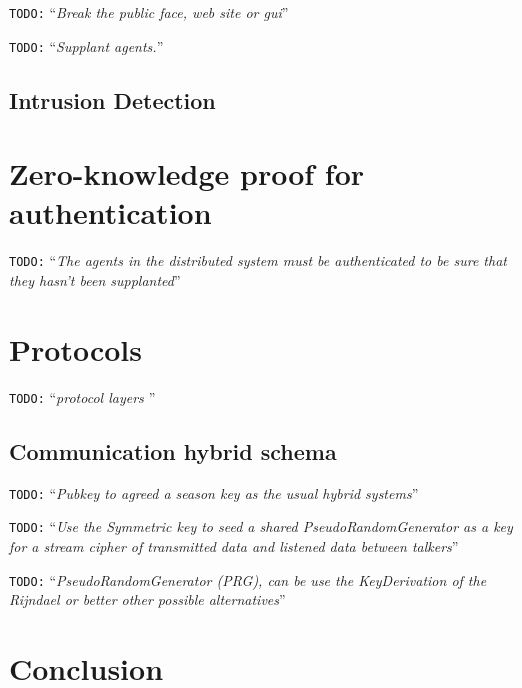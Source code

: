 \documentclass[10pt,a4paper,twoside]{llncs}
\newcommand{\todo}[1]{\texttt{\color{red}TODO:} ``\emph{#1}''}
\begin{document}
\todo{Break the public face, web site or gui}

\todo{Supplant agents.}

%
\subsection{Intrusion Detection}

%
\section{Zero-knowledge proof for authentication \label{sec:auth}}

\todo{The agents in the distributed system must be authenticated to be sure that they hasn't been supplanted}

%
\section{Protocols}

\todo{protocol layers \cite{Schneier:1995:ACP:572932}}

%
\subsection{Communication hybrid schema \label{sec:intercom}}

\todo{Pubkey to agreed a season key as the usual hybrid systems}

\todo{Use the Symmetric key to seed a shared PseudoRandomGenerator as a key for a stream cipher of transmitted data and listened data between talkers}

\todo{\emph{PseudoRandomGenerator} (PRG), can be use the KeyDerivation of the Rijndael or better other possible alternatives}

%
\section{Conclusion \label{sec:conclusions}}



\end{document}
